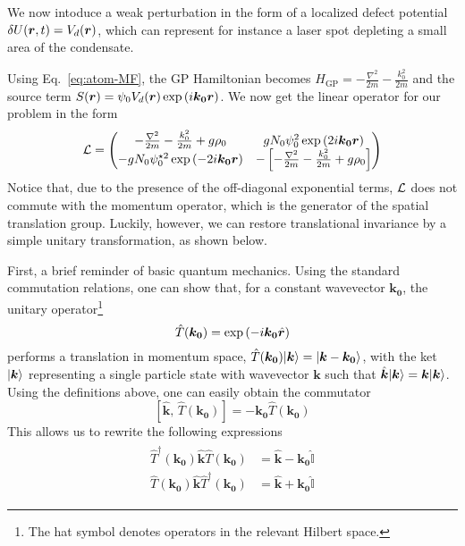 We now intoduce a weak perturbation in the form of a localized defect
potential $\delta U(\bm{r}, t) = V_d(\bm{r})$, which can represent for
instance a laser spot depleting a small area of the condensate.

Using Eq.~\eqref{eq:atom-MF}, the GP Hamiltonian becomes
$H_{\text{GP}} = -\frac{\nabla^2}{2m} - \frac{k_0^2}{2m}$ and the
source term
$S(\bm{r}) = \psi_0 V_d(\bm{r}) \exp \left( i \bm{k_0} \bm{r} \right)$. We now
get the linear operator for our problem in the form
%
\begin{equation}\label{eq:ourL}
  \mathcal{L} = \begin{pmatrix} -\frac{\nabla^2}{2m} - \frac{k_0^2}{2m} + g\rho_0 & g N_0 \psi_0^2 \exp \left( 2 i \bm{k_0} \bm{r} \right)\\ - g N_0 \psi_0^{\star 2} \exp \left( - 2 i \bm{k_0} \bm{r} \right) & -\left[ -\frac{\nabla^2}{2m} - \frac{k_0^2}{2m} + g\rho_0 \right] \end{pmatrix}
\end{equation}
% 
Notice that, due to the presence of the off-diagonal exponential
terms, $\mathcal{L}$ does not commute with the momentum operator, which is
the generator of the spatial translation group. Luckily, however, we
can restore translational invariance by a simple unitary
transformation, as shown below.

First, a brief reminder of basic quantum mechanics. Using the standard
commutation relations, one can show that, for a constant wavevector
$\bm{k_0}$, the unitary operator\footnote{The hat symbol denotes
  operators in the relevant Hilbert space.}
%
\begin{equation}\label{eq:trans-oper}
  \hat{T}(\bm{k_0}) = \exp \left( -i \bm{k_0} \hat{\bm{r}} \right)
\end{equation}
% 
performs a translation in momentum space,
$\hat{T}(\bm{k_0}) \vert \bm{k} \rangle = \vert \bm{k} - \bm{k_0} \rangle$, with the
ket $\vert \bm{k} \rangle$ representing a single particle state with
wavevector $\bm{k}$ such that
$\hat{\bm{k}} \vert \bm{k} \rangle = \bm{k} \vert \bm{k} \rangle$. Using the
definitions above, one can easily obtain the commutator
%
\begin{equation}\label{eq:trans-commutator}
  \left[ \hat{\bm{k}},\, \hat{T}(\bm{k_0}) \right] = -\bm{k_0}\hat{T}(\bm{k_0}) 
\end{equation}
% 
This allows us to rewrite the following expressions
\begin{align}\label{eq:products}
  \begin{split}
    \hat{T}^{\dagger}(\bm{k_0})\hat{\bm{k}}\hat{T}(\bm{k_0})& = \hat{\bm{k}} - \bm{k_0}\hat{\mathbb{I}}\\
    \hat{T}(\bm{k_0})\hat{\bm{k}}\hat{T}^{\dagger}(\bm{k_0})& = \hat{\bm{k}} + \bm{k_0}\hat{\mathbb{I}}  
  \end{split}
\end{align}

